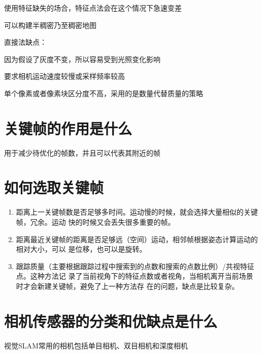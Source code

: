 \documentclass[10pt]{article}
\begin{document}
使用特征缺失的场合，特征点法会在这个情况下急速变差

可以构建半稠密乃至稠密地图

\noindent 直接法缺点：

因为假设了灰度不变，所以容易受到光照变化影响

要求相机运动速度较慢或采样频率较高

单个像素或者像素块区分度不高，采用的是数量代替质量的策略

\section{关键帧的作用是什么}
用于减少待优化的帧数，并且可以代表其附近的帧

\section{如何选取关键帧}
\begin{enumerate}
    \item 距离上一关键帧数是否足够多时间。运动慢的时候，就会选择大量相似的关键帧，冗余。运动
    快的时候又会丢失很多重要的帧。
    \item 距离最近关键帧的距离是否足够远（空间）运动，相邻帧根据姿态计算运动的相对大小，可以
    是位移，也可以是旋转。
    \item 跟踪质量（主要根据跟踪过程中搜索到的点数和搜索的点数比例）/共视特征点。这种方法记
    录了当前视角下的特征点数或者视角，当相机离开当前场景时才会新建关键帧，避免了上一种方法存
    在的问题，缺点是比较复杂。
\end{enumerate}
\section{相机传感器的分类和优缺点是什么}
视觉SLAM常用的相机包括单目相机、双目相机和深度相机
\end{document}
